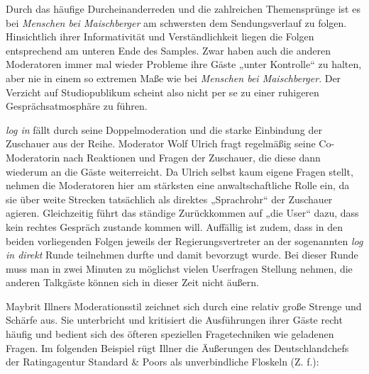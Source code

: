 Durch das häufige Durcheinanderreden und die zahlreichen Themensprünge ist es bei \textit{Menschen bei Maischberger} am schwersten dem Sendungsverlauf zu folgen. Hinsichtlich ihrer Informativität und Verständlichkeit liegen die Folgen entsprechend am unteren Ende des Samples. Zwar haben auch die anderen Moderatoren immer mal wieder Probleme ihre Gäste „unter Kontrolle“ zu halten, aber nie in einem so extremen Maße wie bei \textit{Menschen bei Maischberger}. Der Verzicht auf Studiopublikum scheint also nicht per se zu einer ruhigeren Gesprächsatmosphäre zu führen.

\textit{log in} fällt durch seine Doppelmoderation und die starke Einbindung der Zuschauer aus der Reihe. Moderator Wolf Ulrich fragt regelmäßig seine Co-Moderatorin nach Reaktionen und Fragen der Zuschauer, die diese dann wiederum an die Gäste weiterreicht. Da Ulrich selbst kaum eigene Fragen stellt, nehmen die Moderatoren hier am stärksten eine anwaltschaftliche Rolle ein, da sie über weite Strecken tatsächlich als direktes „Sprachrohr“ der Zuschauer agieren. Gleichzeitig führt das ständige Zurückkommen auf „die User“ dazu, dass kein rechtes Gespräch zustande kommen will. Auffällig ist zudem, dass in den beiden vorliegenden Folgen jeweils der Regierungsvertreter an der sogenannten \textit{log in direkt} Runde teilnehmen durfte und damit bevorzugt wurde. Bei dieser Runde muss man in zwei Minuten zu möglichst vielen Userfragen Stellung nehmen, die anderen Talkgäste können sich in dieser Zeit nicht äußern.

Maybrit Illners Moderationsstil zeichnet sich durch eine relativ große Strenge und Schärfe aus. Sie unterbricht und kritisiert die Ausführungen ihrer Gäste recht häufig und bedient sich des öfteren speziellen Fragetechniken wie geladenen Fragen. Im folgenden Beispiel rügt Illner die Äußerungen des Deutschlandchefs der Ratingagentur Standard \& Poors als unverbindliche Floskeln (Z. f.):

